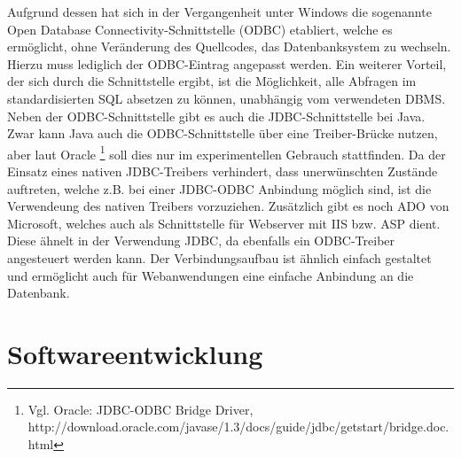 Aufgrund dessen hat sich in der Vergangenheit unter Windows die sogenannte Open Database Connectivity-Schnittstelle (ODBC) etabliert, welche es ermöglicht, ohne Veränderung des Quellcodes, das Datenbanksystem zu wechseln.
Hierzu muss lediglich der ODBC-Eintrag angepasst werden.
Ein weiterer Vorteil, der sich durch die Schnittstelle ergibt, ist die Möglichkeit, alle Abfragen im standardisierten SQL absetzen zu können, unabhängig vom verwendeten DBMS.
Neben der ODBC-Schnittstelle gibt es auch die JDBC-Schnittstelle bei Java.
Zwar kann Java auch die ODBC-Schnittstelle über eine Treiber-Brücke nutzen, aber laut Oracle \footnote{Vgl. Oracle: JDBC-ODBC Bridge Driver, http://download.oracle.com/javase/1.3/docs/guide/jdbc/getstart/bridge.doc.html} soll dies nur im experimentellen Gebrauch stattfinden.
Da der Einsatz eines nativen JDBC-Treibers verhindert, dass unerwünschten Zustände auftreten, welche z.B. bei einer JDBC-ODBC Anbindung möglich sind, ist die Verwendeung des nativen Treibers vorzuziehen.
Zusätzlich gibt es noch ADO von Microsoft, welches auch als Schnittstelle für Webserver mit IIS bzw. ASP dient.
Diese ähnelt in der Verwendung JDBC, da ebenfalls ein ODBC-Treiber angesteuert werden kann.
Der Verbindungsaufbau ist ähnlich einfach gestaltet und ermöglicht auch für Webanwendungen eine einfache Anbindung an die Datenbank.

\section{Softwareentwicklung}
\label{sec:softdev}

